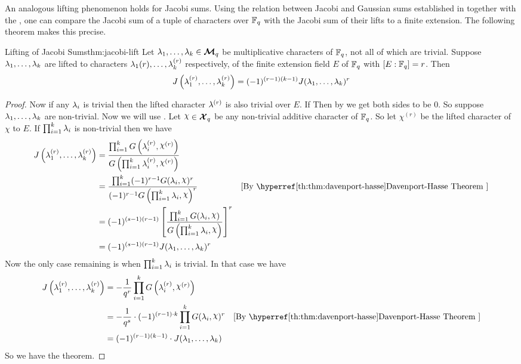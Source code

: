 An analogous lifting phenomenon holds for Jacobi sums. Using the relation between Jacobi and Gaussian sums established in  together with the \DHthm, one can compare the Jacobi sum of a tuple of characters over $\mathbb{F}_q$ with the Jacobi sum of their lifts to a finite extension. The following theorem makes this precise.
\begin{Theorem}{Lifting of Jacobi Sums}{thm:jacobi-lift}
  Let $\lambda_1,\dots,\lambda_k\in\boldsymbol{\mathcal{M}}_q$ be multiplicative characters of $\mathbb{F}_q$, not all of which are trivial. Suppose $\lambda_1,\dots,\lambda_k$ are lifted to characters $\lambda_1{(r)},\dots, \lambda_k^{(r)}$ respectively, of the finite extension field $E$ of $\mathbb{F}_q$ with $[E:\mathbb{F}_q]=r$. Then $$J\left(\lambda_1^{(r)},\dots, \lambda_k^{(r)}\right)=(-1)^{(r-1)(k-1)}J(\lambda_1,\dots,\lambda_k)^r$$
\end{Theorem}
\begin{proof}
  Now if any $\lambda_i$ is trivial then the lifted character $\lambda^{(r)}$ is also trivial over $E$. If Then by  we get both sides to be $0$. So suppose $\lambda_1,\dots,\lambda_k$ are non-trivial. Now we will use . Let $\chi\in\Xq$ be any non-trivial additive character of $\mathbb{F}_q$. So let $\chi^{(r)}$ be the lifted character of $\chi$ to $E$. If $\prod_{i=1}^k \lambda_i$ is non-trivial then we have \begin{align*}
    J\lt(\lm_1^{(r)},\dots, \lm_k^{(r)}\rt) & = \frac{\prod_{i=1}^kG\lt(\lm_i^{(r)},\chi^{(r)}\rt)}{G\lt(\prod_{i=1}^k\lm_i^{(r)},\chi^{(r)}\rt)}\\
    & = \frac{\prod_{i=1}^k(-1)^{r-1}G(\lm_i,\chi)^r}{(-1)^{r-1}G\lt(\prod_{i=1}^k\lm_i,\chi\rt)^r}\by{\DHthm\index{Davenport-Hasse theorem}}\\
    & = (-1)^{(s-1)(r-1)}\lt[ \frac{\prod_{i=1}^kG(\lm_i,\chi)}{G\lt(\prod_{i=1}^k\lm_i,\chi\rt)} \rt]^r\\ 
    & = (-1)^{(s-1)(r-1)}J(\lm_1,\dots,\lm_k)^r
  \end{align*}
  Now the only case remaining is when $\prod_{i=1}^k \lambda_i$ is trivial. In that case we have 
  \begin{align*}
    J\lt(\lm_1^{(r)},\dots, \lm_k^{(r)}\rt) & = -\frac1{q^r}\prod_{i=1}^k G\lt(\lm_i^{(r)},\chi^{(r)}\rt)\\
    & = -\frac1{q^s}\cdot (-1)^{(r-1)\cdot k}\prod_{i=1}^k G(\lm_i,\chi)^r\by{\DHthm\index{Davenport-Hasse theorem}}\\
    & = (-1)^{(r-1)(k-1)}\cdot J(\lm_1,\dots, \lm_k)
  \end{align*}
  So we have the theorem. 
\end{proof}